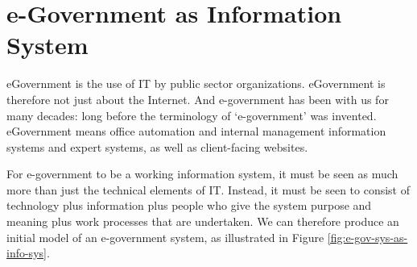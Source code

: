 %
%

\section{e-Government as Information System}\label{sec:e-gov-as-information-system}
eGovernment is the use of IT by public sector organizations. eGovernment is therefore not just about the Internet. And e-government has been with us for many
decades: long before the terminology of `e-government’ was invented. eGovernment
means office automation and internal management information systems and expert
systems, as well as client-facing websites.

For e-government to be a working information system, it must be seen as much more than just the technical elements of IT. Instead, it must be seen to consist of technology plus information plus people who give the system purpose
and meaning plus work processes that are undertaken. We can therefore produce an
initial model of an e-government system, as illustrated in Figure {\ref{fig:e-gov-sys-as-info-sys}}.

